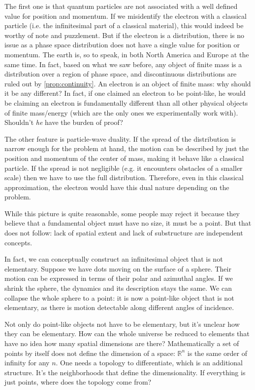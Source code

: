 \documentclass[smallextended]{svjour3}
\numberwithin{equation}{section}
\theoremstyle{definition}
\begin{document}
The first one is that quantum particles are not associated with a well defined value for position and momentum. If we misidentify the electron with a classical particle (i.e. the infinitesimal part of a classical material), this would indeed be worthy of note and puzzlement. But if the electron is a distribution, there is no issue as a phase space distribution does not have a single value for position or momentum. The earth is, so to speak, in both North America and Europe at the same time. In fact, based on what we saw before, any object of finite mass is a distribution over a region of phase space, and discontinuous distributions are ruled out by \ref{prop:continuity}. An electron is an object of finite mass: why should it be any different? In fact, if one claimed an electron to be point-like, he would be claiming an electron is fundamentally different than all other physical objects of finite mass/energy (which are the only ones we experimentally work with). Shouldn't \emph{he} have the burden of proof?

The other feature is particle-wave duality. If the spread of the distribution is narrow enough for the problem at hand, the motion can be described by just the position and momentum of the center of mass, making it behave like a classical particle. If the spread is not negligible (e.g. it encounters obstacles of a smaller scale) then we have to use the full distribution. Therefore, even in this classical approximation, the electron would have this dual nature depending on the problem.

While this picture is quite reasonable, some people may reject it because they believe that a fundamental object must have no size, it must be a point. But that does not follow: lack of spatial extent and lack of substructure are independent concepts.

In fact, we can conceptually construct an infinitesimal object that is not elementary. Suppose we have dots moving on the surface of a sphere. Their motion can be expressed in terms of their polar and azimuthal angles. If we shrink the sphere, the dynamics and its description stays the same. We can collapse the whole sphere to a point: it is now a point-like object that is not elementary, as there is motion detectable along different angles of incidence.

Not only do point-like objects not have to be elementary, but it's unclear how they can be elementary. How can the whole universe be reduced to  elements that have no idea how many spatial dimensions are there? Mathematically a set of points by itself does not define the dimension of a space: $\mathbb{R}^n$ is the same order of infinity for any $n$. One needs a topology to differentiate, which is an additional structure. It's the neighborhoods that define the dimensionality. If everything is just points, where does the topology come from? 
\end{document}
